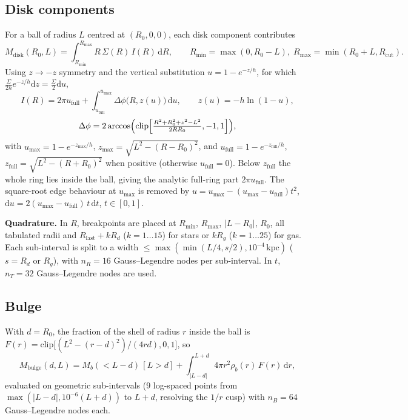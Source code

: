 \documentclass[10pt,a4paper]{article}
\begin{document}
\subsection{Disk components}
For a ball of radius $L$ centred at $(R_0,0,0)$, each disk component contributes
\begin{equation*}
M_\mathrm{disk}(R_0,L)=\int_{R_\mathrm{min}}^{R_\mathrm{max}}R\,\Sigma(R)\,I(R)\,\mathrm{d}R,\qquad R_\mathrm{min}=\max(0,R_0-L),\; R_\mathrm{max}=\min(R_0+L,R_\mathrm{cut}).
\end{equation*}
Using $z\to-z$ symmetry and the vertical substitution $u=1-e^{-z/h}$, for which $\tfrac{\Sigma}{2h}e^{-z/h}\mathrm{d}z=\tfrac{\Sigma}{2}\mathrm{d}u$,
\begin{equation*}
I(R)=2\pi u_\mathrm{full}+\int_{u_\mathrm{full}}^{u_\mathrm{max}}\Delta\phi\bigl(R,z(u)\bigr)\,\mathrm{d}u,\qquad z(u)=-h\ln(1-u),
\end{equation*}
\begin{equation*}
\Delta\phi=2\arccos\Bigl(\mathrm{clip}\Bigl[\tfrac{R^2+R_0^2+z^2-L^2}{2RR_0},-1,1\Bigr]\Bigr),
\end{equation*}
with $u_\mathrm{max}=1-e^{-z_\mathrm{max}/h}$, $z_\mathrm{max}=\sqrt{L^2-(R-R_0)^2}$, and $u_\mathrm{full}=1-e^{-z_\mathrm{full}/h}$, $z_\mathrm{full}=\sqrt{L^2-(R+R_0)^2}$ when positive (otherwise $u_\mathrm{full}=0$). Below $z_\mathrm{full}$ the whole ring lies inside the ball, giving the analytic full-ring part $2\pi u_\mathrm{full}$. The square-root edge behaviour at $u_\mathrm{max}$ is removed by $u=u_\mathrm{max}-(u_\mathrm{max}-u_\mathrm{full})t^2$, $\mathrm{d}u=2(u_\mathrm{max}-u_\mathrm{full})\,t\,\mathrm{d}t$, $t\in[0,1]$.

\textbf{Quadrature.} In $R$, breakpoints are placed at $R_\mathrm{min}$, $R_\mathrm{max}$, $|L-R_0|$, $R_0$, all tabulated radii and $R_\mathrm{last}+kR_d$ ($k=1\dots15$) for stars or $kR_g$ ($k=1\dots25$) for gas. Each sub-interval is split to a width $\le\max(\min(L/4,s/2),10^{-4}\,\mathrm{kpc})$ ($s=R_d$ or $R_g$), with $n_R=16$ Gauss--Legendre nodes per sub-interval. In $t$, $n_T=32$ Gauss--Legendre nodes are used.

\subsection{Bulge}
With $d=R_0$, the fraction of the shell of radius $r$ inside the ball is $F(r)=\mathrm{clip}\bigl[(L^2-(r-d)^2)/(4rd),0,1\bigr]$, so
\begin{equation*}
M_\mathrm{bulge}(d,L)=M_b(<L-d)\,[L>d]+\int_{|L-d|}^{L+d}4\pi r^2\rho_b(r)\,F(r)\,\mathrm{d}r,
\end{equation*}
evaluated on geometric sub-intervals (9 log-spaced points from $\max(|L-d|,10^{-6}(L+d))$ to $L+d$, resolving the $1/r$ cusp) with $n_B=64$ Gauss--Legendre nodes each.
\end{document}
